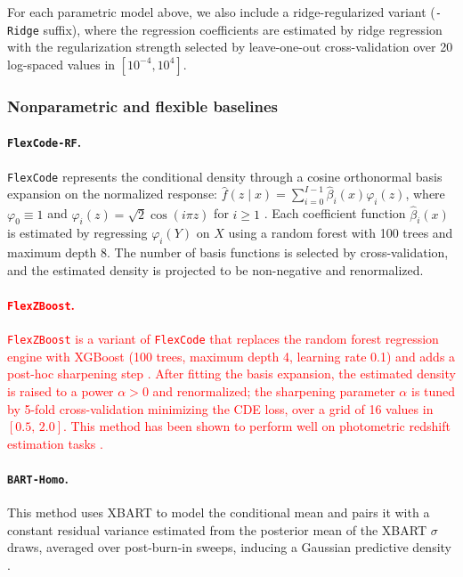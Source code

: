 \documentclass{article}
\newcommand{\method}[1]{\texttt{#1}}
\begin{document}
For each parametric model above, we also include a ridge-regularized variant
(\method{-Ridge} suffix), where the regression coefficients are estimated by
ridge regression with the regularization strength selected by leave-one-out
cross-validation over 20 log-spaced values in $[10^{-4},10^4]$.

\subsubsection{Nonparametric and flexible baselines}
\label{app:nonparametric_details}

\paragraph{\method{FlexCode-RF}.}
\method{FlexCode} represents the conditional density through a cosine
orthonormal basis expansion on the normalized response:
$\hat f(z\mid x)=\sum_{i=0}^{I-1}\hat\beta_i(x)\varphi_i(z)$, where
$\varphi_0\equiv 1$ and
$\varphi_i(z)=\sqrt{2}\cos(i\pi z)$ for $i\geq 1$
\citep{izbicki2017converting}. Each coefficient function $\hat\beta_i(x)$ is
estimated by regressing $\varphi_i(Y)$ on $X$ using a random forest with 100
trees and maximum depth 8. The number of basis functions is selected by
cross-validation, and the estimated density is projected to be non-negative and
renormalized.

\paragraph{\textcolor{red}{\method{FlexZBoost}.}}
\textcolor{red}{\method{FlexZBoost} is a variant of \method{FlexCode} that replaces the random forest regression engine with XGBoost (100 trees, maximum depth 4, learning rate 0.1) and adds a post-hoc sharpening step \citep{dalmasso2020cdetools}. After fitting the basis expansion, the estimated density is raised to a power $\alpha > 0$ and renormalized; the sharpening parameter $\alpha$ is tuned by 5-fold cross-validation minimizing the CDE loss, over a grid of 16 values in $[0.5,\, 2.0]$. This method has been shown to perform well on photometric redshift estimation tasks \citep{schmidt2020evaluation}.}

\paragraph{\method{BART-Homo}.}
This method uses XBART to model the conditional mean and pairs it with a
constant residual variance estimated from the posterior mean of the XBART
$\sigma$ draws, averaged over post-burn-in sweeps, inducing a Gaussian
predictive density \citep{chipman2010bart,he2019xbart}.
\end{document}
